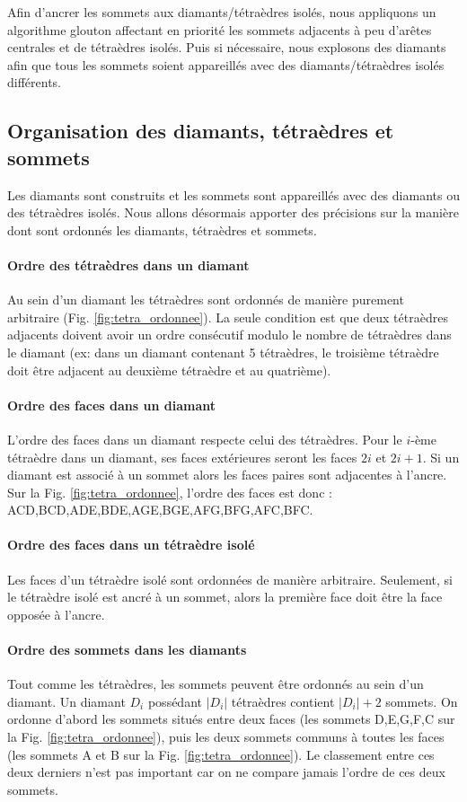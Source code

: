 \noindent
Afin d'ancrer les sommets aux diamants/tétraèdres isolés, nous appliquons un algorithme glouton affectant en priorité les sommets adjacents à peu d'arêtes centrales et de tétraèdres isolés. Puis si nécessaire, nous explosons des diamants afin que tous les sommets soient appareillés avec des diamants/tétraèdres isolés différents.

\subsection{Organisation des diamants, tétraèdres et sommets}
\noindent
Les diamants sont construits et les sommets sont appareillés avec des diamants ou des tétraèdres isolés. Nous allons désormais apporter des précisions sur la manière dont sont ordonnés les diamants, tétraèdres et sommets.
\paragraph{Ordre des tétraèdres dans un diamant}
Au sein d'un diamant les tétraèdres sont ordonnés de manière purement arbitraire (Fig. \ref{fig:tetra_ordonnee}). La seule condition est que deux tétraèdres adjacents doivent avoir un ordre consécutif modulo le nombre de tétraèdres dans le diamant (ex: dans un diamant contenant 5 tétraèdres, le troisième tétraèdre doit être adjacent au deuxième tétraèdre et au quatrième).
\paragraph{Ordre des faces dans un diamant}
L'ordre des faces dans un diamant respecte celui des tétraèdres. Pour le $i$-ème tétraèdre dans un diamant, ses faces extérieures seront les faces $2i$ et $2i+1$. Si un diamant est associé à un sommet alors les faces paires sont adjacentes à l'ancre. Sur la Fig. \ref{fig:tetra_ordonnee}, l'ordre des faces est donc : ACD,BCD,ADE,BDE,AGE,BGE,AFG,BFG,AFC,BFC.
\paragraph{Ordre des faces dans un tétraèdre isolé}
Les faces d'un tétraèdre isolé sont ordonnées de manière arbitraire. Seulement, si le tétraèdre isolé est ancré à un sommet, alors la première face doit être la face opposée à l'ancre.
\paragraph{Ordre des sommets dans les diamants}
\label{Ordre des sommets dans les diamants}Tout comme les tétraèdres, les sommets peuvent être ordonnés au sein d'un diamant. Un diamant $D_i$ possédant $|D_i|$ tétraèdres contient $|D_i|+2$ sommets. On ordonne d'abord les sommets situés entre deux faces (les sommets D,E,G,F,C sur la Fig. \ref{fig:tetra_ordonnee}), puis les deux sommets communs à toutes les faces (les sommets A et B sur la Fig. \ref{fig:tetra_ordonnee}). Le classement entre ces deux derniers n'est pas important car on ne compare jamais l'ordre de ces deux sommets.
